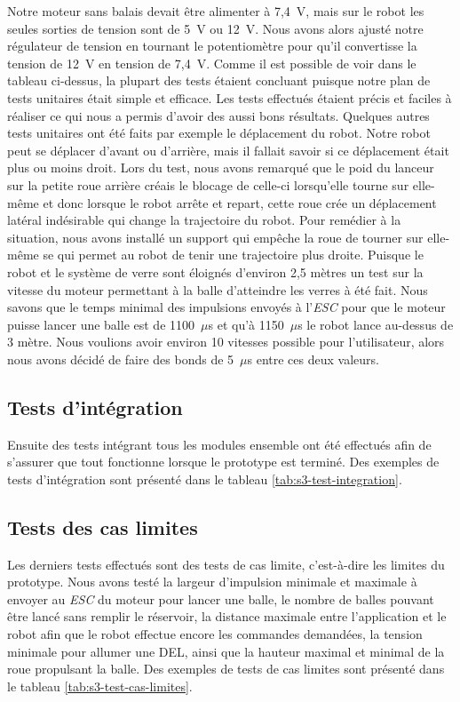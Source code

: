 Notre moteur sans balais devait être alimenter à 7,4~V, mais sur le robot les seules sorties de tension sont de 5~V ou 12~V.
Nous avons alors ajusté notre régulateur de tension en tournant le potentiomètre pour qu’il convertisse la tension de 12~V en tension de 7,4~V.
Comme il est possible de voir dans le tableau ci-dessus, la plupart des tests étaient concluant puisque notre plan de tests unitaires était simple et efficace.
Les tests effectués étaient précis et faciles à réaliser ce qui nous a permis d’avoir des aussi bons résultats.
Quelques autres tests unitaires ont été faits par exemple le déplacement du robot.
Notre robot peut se déplacer d’avant ou d’arrière, mais il fallait savoir si ce déplacement était plus ou moins droit.
Lors du test, nous avons remarqué que le poid du lanceur sur la petite roue arrière créais le blocage de celle-ci lorsqu’elle tourne sur elle-même et donc lorsque le robot arrête et repart, cette roue crée un déplacement latéral indésirable qui change la trajectoire du robot.
Pour remédier à la situation, nous avons installé un support qui empêche la roue de tourner sur elle-même se qui permet au robot de tenir une trajectoire plus droite.
Puisque le robot et le système de verre sont éloignés d’environ 2,5 mètres un test sur la vitesse du moteur permettant à la balle d’atteindre les verres à été fait.
Nous savons que le temps minimal des impulsions envoyés à l'\emph{ESC} pour que le moteur puisse lancer une balle est de 1100~$\mu$s et qu’à 1150~$\mu$s le robot lance au-dessus de 3 mètre.
Nous voulions avoir environ 10 vitesses possible pour l’utilisateur, alors nous avons décidé de faire des bonds de 5~$\mu$s entre ces deux valeurs.

\subsection{Tests d'intégration}

Ensuite des tests intégrant tous les modules ensemble ont été effectués afin de s’assurer que tout fonctionne lorsque le prototype est terminé.
Des exemples de tests d'intégration sont présenté dans le tableau \ref{tab:s3-test-integration}.

\subsection{Tests des cas limites}

Les derniers tests effectués sont des tests de cas limite, c’est-à-dire les limites du prototype.
Nous avons testé la largeur d’impulsion minimale et maximale à envoyer au \emph{ESC} du moteur pour lancer une balle, le nombre de balles pouvant être lancé sans remplir le réservoir, la distance maximale entre l’application et le robot afin que le robot effectue encore les commandes demandées, la tension minimale pour allumer une DEL, ainsi que la hauteur maximal et minimal de la roue propulsant la balle.
Des exemples de tests de cas limites sont présenté dans le tableau \ref{tab:s3-test-cas-limites}.

